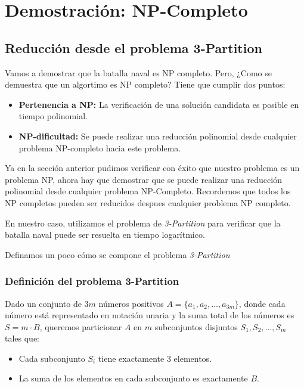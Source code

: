 \section{Demostración: NP-Completo}


\subsection*{Reducción desde el problema 3-Partition}

Vamos a demostrar que la batalla naval es NP completo. Pero, ¿Como se demuestra que un algortimo es NP completo? Tiene que cumplir dos puntos: 

\begin{itemize}
    \item \textbf{Pertenencia a NP:} La verificación de una solución candidata es posible en tiempo polinomial.
    \item \textbf{NP-dificultad:} Se puede realizar una reducción polinomial desde cualquier problema NP-completo hacia este problema.
\end{itemize}

Ya en la sección anterior pudimos verificar con éxito que nuestro problema es un problema NP, ahora hay que demostrar que se puede realizar una reducción polinomial desde cualquier problema NP-Completo. Recordemos que todos los NP completos pueden ser reducidos despues cualquier problema NP completo. 

En nuestro caso, utilizamos el problema de \textit{3-Partition} para verificar que la batalla naval puede ser resuelta en tiempo logarítmico.


Definamos un poco cómo se compone el problema \textit{3-Partition}



\subsubsection*{Definición del problema 3-Partition}

Dado un conjunto de \(3m\) números positivos \(A = \{a_1, a_2, \dots, a_{3m}\}\), donde cada número está representado en notación unaria y la suma total de los números es \(S = m \cdot B\), queremos particionar \(A\) en \(m\) subconjuntos disjuntos \(S_1, S_2, \dots, S_m\) tales que:
\begin{itemize}
    \item Cada subconjunto \(S_i\) tiene exactamente 3 elementos.
    \item La suma de los elementos en cada subconjunto es exactamente \(B\).
\end{itemize}

